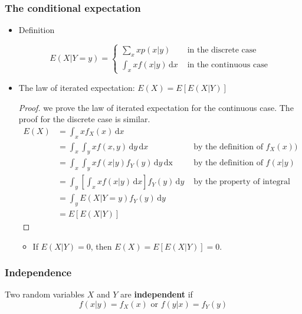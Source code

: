 \documentclass[a4paper,11pt]{article}
\begin{document}
\subsubsection*{The conditional expectation}
\label{sec:orgbef54f4}
\begin{itemize}
\item Definition
\label{sec:org9dcacd7}

\begin{equation*}
E(X|Y=y) =
\begin{cases}
\sum_{x}xp(x|y) & \text{ in the discrete case} \\
\int_{x}xf(x|y)\, \mathrm{d}x & \text{ in the continuous case}
\end{cases}
\end{equation*}

\item The law of iterated expectation: \(E(X) = E\left[E(X|Y)\right]\)
\label{sec:org146322c}

\begin{proof}
we prove the law of iterated expectation for the continuous case. The proof for the discrete case is similar.
\begin{align*}
E(X) & = \int_{x} xf_{X}(x)\, \mathrm{d}x \\
     & = \int_{x}\int_{y} xf(x, y)\, \mathrm{d}y\, \mathrm{d}x & \text{ by the definition of } f_{X}(x)) \\
     & = \int_{x}\int_{y} xf(x|y)f_{Y}(y)\, \mathrm{d}y\, \mathrm{dx} & \text{ by the definition of } f(x|y) \\
     & = \int_{y} \left[\int_{x} xf(x|y)\, \mathrm{d}x \right] f_{Y}(y)\, \mathrm{d}y & \text{ by the property of integral} \\
     & = \int_{y} E(X|Y=y)f_{Y}(y)\, \mathrm{d}y & \\
     & = E\left[E(X|Y)\right]
\end{align*}
\end{proof}

\begin{itemize}
\item If \(E(X|Y) = 0\), then \(E(X)=E\left[E(X|Y)\right]=0\).
\end{itemize}
\end{itemize}

\subsubsection*{Independence}
\label{sec:orgfd917ff}
Two random variables \(X\) and \(Y\) are \textbf{independent} if
\[ f(x|y) = f_{X}(x) \text{ or } f(y|x) = f_{Y}(y) \]
\end{document}
